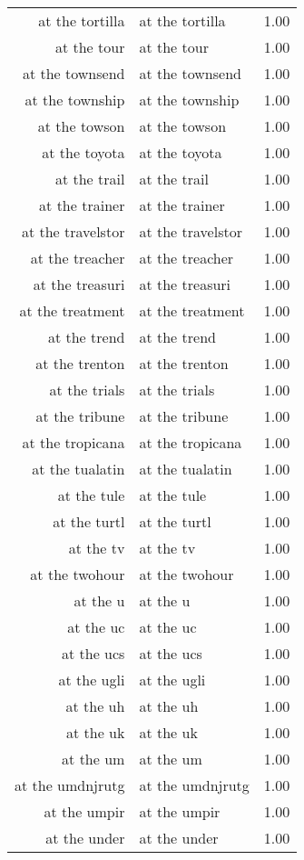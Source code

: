 \begin{table}[ht]
\begin{tabular}{rlr}
  at the tortilla & at the tortilla & 1.00 \\ 
  at the tour & at the tour & 1.00 \\ 
  at the townsend & at the townsend & 1.00 \\ 
  at the township & at the township & 1.00 \\ 
  at the towson & at the towson & 1.00 \\ 
  at the toyota & at the toyota & 1.00 \\ 
  at the trail & at the trail & 1.00 \\ 
  at the trainer & at the trainer & 1.00 \\ 
  at the travelstor & at the travelstor & 1.00 \\ 
  at the treacher & at the treacher & 1.00 \\ 
  at the treasuri & at the treasuri & 1.00 \\ 
  at the treatment & at the treatment & 1.00 \\ 
  at the trend & at the trend & 1.00 \\ 
  at the trenton & at the trenton & 1.00 \\ 
  at the trials & at the trials & 1.00 \\ 
  at the tribune & at the tribune & 1.00 \\ 
  at the tropicana & at the tropicana & 1.00 \\ 
  at the tualatin & at the tualatin & 1.00 \\ 
  at the tule & at the tule & 1.00 \\ 
  at the turtl & at the turtl & 1.00 \\ 
  at the tv & at the tv & 1.00 \\ 
  at the twohour & at the twohour & 1.00 \\ 
  at the u & at the u & 1.00 \\ 
  at the uc & at the uc & 1.00 \\ 
  at the ucs & at the ucs & 1.00 \\ 
  at the ugli & at the ugli & 1.00 \\ 
  at the uh & at the uh & 1.00 \\ 
  at the uk & at the uk & 1.00 \\ 
  at the um & at the um & 1.00 \\ 
  at the umdnjrutg & at the umdnjrutg & 1.00 \\ 
  at the umpir & at the umpir & 1.00 \\ 
  at the under & at the under & 1.00 \\ 

\end{tabular}
\end{table}
